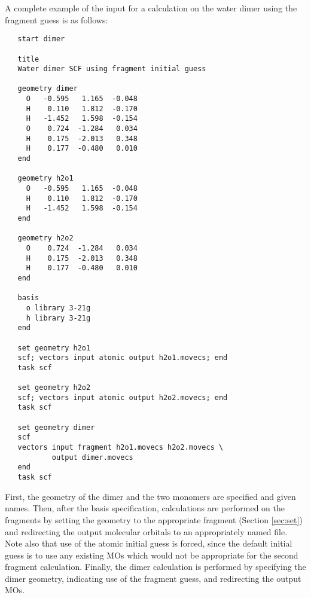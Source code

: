A complete example of the input for a calculation on the water
dimer using the fragment guess is as follows:
\begin{verbatim}
   start dimer

   title
   Water dimer SCF using fragment initial guess

   geometry dimer
     O   -0.595   1.165  -0.048
     H    0.110   1.812  -0.170
     H   -1.452   1.598  -0.154
     O    0.724  -1.284   0.034
     H    0.175  -2.013   0.348
     H    0.177  -0.480   0.010
   end

   geometry h2o1
     O   -0.595   1.165  -0.048
     H    0.110   1.812  -0.170
     H   -1.452   1.598  -0.154
   end

   geometry h2o2
     O    0.724  -1.284   0.034
     H    0.175  -2.013   0.348
     H    0.177  -0.480   0.010
   end

   basis
     o library 3-21g
     h library 3-21g
   end

   set geometry h2o1
   scf; vectors input atomic output h2o1.movecs; end
   task scf

   set geometry h2o2
   scf; vectors input atomic output h2o2.movecs; end
   task scf

   set geometry dimer
   scf
   vectors input fragment h2o1.movecs h2o2.movecs \
           output dimer.movecs
   end
   task scf
\end{verbatim}
First, the geometry of the dimer and the two monomers are specified
and given names.  Then, after the basis specification, calculations
are performed on the fragments by setting the geometry to the
appropriate fragment (Section \ref{sec:set}) and redirecting the
output molecular orbitals to an appropriately named file.  Note also
that use of the atomic initial guess is forced, since the default
initial guess is to use any existing MOs which would not be
appropriate for the second fragment calculation.  Finally, the dimer
calculation is performed by specifying the dimer geometry, indicating
use of the fragment guess, and redirecting the output MOs.

